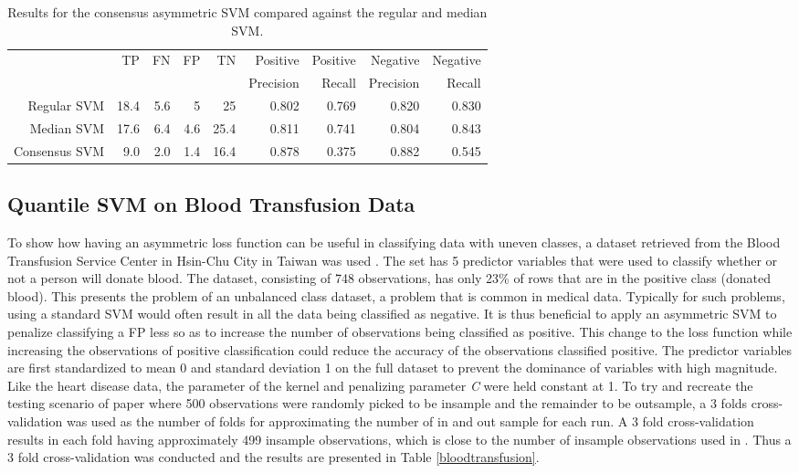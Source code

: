 \begin{table}[htbp]\label{table:HeartDisease3}
  \centering
    \begin{tabular}{rrrrrrrrr}
    \hline
       & \multirow{2}{*}{TP}    & \multirow{2}{*}{FN}    & \multirow{2}{*}{FP}    & \multirow{2}{*}{TN} & Positive & Positive & Negative & Negative\\
&&&&&  Precision &  Recall &  Precision &  Recall \bigstrut\\
    \hline
    \hline
    Regular SVM & 18.4  & 5.6   & 5     & 25    & 0.802 & 0.769 & 0.820 & 0.830 \bigstrut[t]\\
    Median SVM & 17.6  & 6.4   & 4.6   & 25.4  & 0.811 & 0.741 & 0.804 & 0.843 \\
    Consensus SVM & 9.0   & 2.0   & 1.4   & 16.4  & 0.878 & 0.375 & 0.882 & 0.545 \bigstrut[b]\\
    \hline
    \hline
    \end{tabular}%
    \caption{Results for the consensus asymmetric SVM compared against the regular and median SVM.}
\end{table}%


\subsection{Quantile SVM on Blood Transfusion Data}
To show how having an asymmetric loss function can be useful in classifying data with uneven classes, a dataset retrieved from the Blood Transfusion Service Center in Hsin-Chu City in Taiwan was used \citep{Yeh09}. The set has 5 predictor variables that were used to classify whether or not a person will donate blood. The dataset, consisting of 748 observations, has only 23\% of rows that are in the positive class (donated blood). This presents the problem of an unbalanced class dataset, a problem that is common in medical data. Typically for such problems, using a standard SVM would often result in all the data being classified as negative. It is thus beneficial to apply an asymmetric SVM to penalize classifying a FP less so as to increase the number of observations being classified as positive. This change to the loss function while increasing the observations of positive classification could reduce the accuracy of the observations classified positive. The predictor variables are first standardized to mean 0 and standard deviation 1 on the full dataset to prevent the dominance of variables with high magnitude. Like the heart disease data, the parameter of the kernel and penalizing parameter \emph{C} were held constant at 1. To try and recreate the testing scenario of \citet{Yeh09} paper where 500 observations were randomly picked to be insample and the remainder to be outsample, a 3 folds cross-validation was used as the number of folds for approximating the number of in and out sample for each run. A 3 fold cross-validation results in each fold having approximately 499 insample observations, which is close to the number of insample observations used in \citet{Yeh09}. Thus a 3 fold cross-validation was conducted and the results are presented in Table \ref{bloodtransfusion}.



